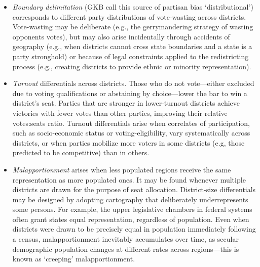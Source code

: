 \documentclass[letter,12pt]{article}
\begin{document}
\begin{itemize}
\item \emph{Boundary delimitation} (GKB call this source of partisan bias `distributional') corresponds to different party distributions of vote-wasting across districts. Vote-wasting may be deliberate (e.g., the gerrymandering strategy of wasting opponents votes), but may also arise incidentally through accidents of geography (e.g., when districts cannot cross state boundaries and a state is a party stronghold) or because of legal constraints applied to the redistricting process (e.g., creating districts to provide ethnic or minority representation).
\item \emph{Turnout} differentials across districts. Those who do not vote---either excluded due to voting qualifications or abstaining by choice---lower the bar to win a district's seat. Parties that are stronger in lower-turnout districts achieve victories with fewer votes than other parties, improving their relative votes:seats ratio. Turnout differentials arise when correlates of participation, such as socio-economic status or voting-eligibility, vary systematically across districts, or when parties mobilize more voters in some districts (e.g, those predicted to be competitive) than in others.
\item \emph{Malapportionment} arises when less populated regions receive the same representation as more populated ones. It may be found whenever multiple districts are drawn for the purpose of seat allocation. District-size differentials may be designed by adopting cartography that deliberately underrepresents some persons. For example, the upper legislative chambers in federal systems often grant states equal representation, regardless of population. Even when districts were drawn to be precisely equal in population immediately following a census, malapportionment inevitably accumulates over time, as secular demographic population changes at different rates across regions---this is known as `creeping' malapportionment.
\end{itemize} 

\end{document}
